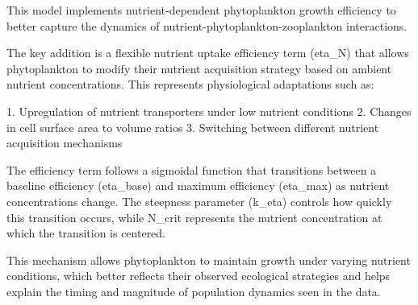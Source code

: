 This model implements nutrient-dependent phytoplankton growth efficiency to better capture the dynamics of nutrient-phytoplankton-zooplankton interactions. 

The key addition is a flexible nutrient uptake efficiency term (eta_N) that allows phytoplankton to modify their nutrient acquisition strategy based on ambient nutrient concentrations. This represents physiological adaptations such as:

1. Upregulation of nutrient transporters under low nutrient conditions
2. Changes in cell surface area to volume ratios
3. Switching between different nutrient acquisition mechanisms

The efficiency term follows a sigmoidal function that transitions between a baseline efficiency (eta_base) and maximum efficiency (eta_max) as nutrient concentrations change. The steepness parameter (k_eta) controls how quickly this transition occurs, while N_crit represents the nutrient concentration at which the transition is centered.

This mechanism allows phytoplankton to maintain growth under varying nutrient conditions, which better reflects their observed ecological strategies and helps explain the timing and magnitude of population dynamics seen in the data.
